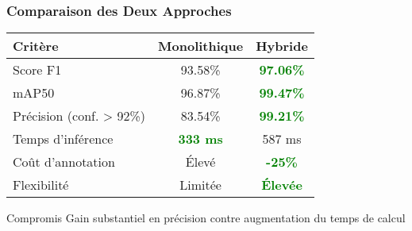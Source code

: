 \documentclass[
	11pt,
	aspectratio=169,
]{beamer}
\begin{document}
\begin{frame}
	\frametitle{Comparaison des Deux Approches}
	
	\begin{table}
		\centering
		\begin{tabular}{lcc}
			\toprule
			\textbf{Critère} & \textbf{Monolithique} & \textbf{Hybride} \\
			\midrule
			Score F1 & 93.58\% & \textcolor{green}{\textbf{97.06\%}} \\
			mAP50 & 96.87\% & \textcolor{green}{\textbf{99.47\%}} \\
			Précision (conf. > 92\%) & 83.54\% & \textcolor{green}{\textbf{99.21\%}} \\
			Temps d'inférence & \textcolor{green}{\textbf{333 ms}} & 587 ms \\
			Coût d'annotation & Élevé & \textcolor{green}{\textbf{-25\%}} \\
			Flexibilité & Limitée & \textcolor{green}{\textbf{Élevée}} \\
			\bottomrule
		\end{tabular}
	\end{table}
	
	\bigskip
	
	\begin{block}{Compromis}
		Gain substantiel en précision contre augmentation du temps de calcul
	\end{block}
\end{frame}

\end{document}
